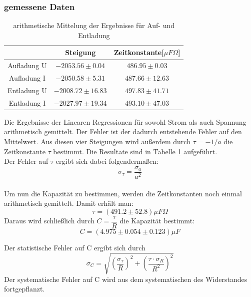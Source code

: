 \documentclass[12pt,a4paper]{article}
\begin{document}
\subsubsection{gemessene Daten}
\begin{table}[H]
\begin{center}
\begin{tabular}{|c|c|c|}
\hline 
 & Steigung & Zeitkonstante[$ \mu F\Omega$] \\ 
\hline 
Aufladung U & $-2053.56\pm 0.04$ & $486.95\pm 0.03$ \\ 
\hline 
Aufladung I  & $-2050.58\pm 5.31$ & $487.66\pm 12.63$\\ 
\hline 
Entladung U & $-2008.72\pm 16.83$ & $497.83\pm 41.71$ \\ 
\hline 
Entladung I  & $-2027.97\pm 19.34$ & $493.10\pm 47.03$ \\ 
\hline 
\end{tabular} 
\end{center}
\caption{arithmetische Mittelung der Ergebnisse für Auf- und Entladung}
\label{tab:kond_linreg} 
\end{table}
Die Ergebnisse der Linearen Regressionen für sowohl Strom als auch Spannung arithmetisch gemittelt. Der Fehler ist der dadurch entstehende Fehler auf den Mittelwert.
Aus diesen vier Steigungen wird außerdem durch $\tau = -1/a$ die Zeitkonstante $\tau$ bestimmt. Die Resultate sind in Tabelle \ref{tab:kond_linreg} aufgeführt.\\
Der Fehler auf $\tau$ ergibt sich dabei folgendermaßen:
\begin{equation}
\sigma_{\tau}=\dfrac{\sigma_{a}}{a^{2}}
\end{equation}\\
Um nun die Kapazität zu bestimmen, werden die Zeitkonstanten noch einmal arithmetisch gemittelt. Damit erhält man:
\begin{equation}
\tau = (491.2\pm 52.8) \mu F\Omega
\end{equation}
Daraus wird schließlich durch $C=\dfrac{\tau}{R}$ die Kapazität bestimmt:
\begin{equation}
C = (4.975\pm 0.054\pm0.123)\mu F
\end{equation}

Der statistische Fehler auf C ergibt sich durch
\begin{equation}
\sigma_C = \sqrt{\left(\dfrac{\sigma_{\tau}}{R}\right)^{2}+\left(\dfrac{\tau \cdot \sigma_{R}}{R^{2}}\right)^{2}}
\end{equation}
Der systematische Fehler auf C wird aus dem systematischen des Widerstandes fortgepflanzt.
\newpage
\end{document}
